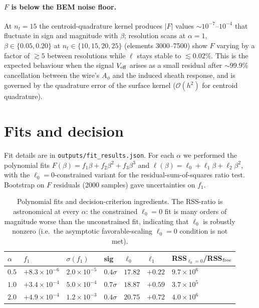 \documentclass[11pt]{article}
\begin{document}
\paragraph{$F$ is below the BEM noise floor.}  At $n_t=15$ the
centroid-quadrature kernel produces $|F|$ values $\sim10^{-7}$--$10^{-4}$
that fluctuate in sign and magnitude with $\beta$; resolution scans at
$\alpha=1$, $\beta\in\{0.05, 0.20\}$ at $n_t\in\{10,15,20,25\}$
(elements 3000--7500) show $F$ varying by a factor of $\gtrsim 5$
between resolutions while $\ell$ stays stable to $\lesssim 0.02\%$.
This is the expected behaviour when the signal $V_{\rm eff}$ arises as a
small residual after $\sim 99.9\%$ cancellation between the wire's
$A_\phi$ and the induced sheath response, and is governed by the
quadrature error of the surface kernel ($\mathcal O(h^2)$ for centroid
quadrature).

\section{Fits and decision}
\label{sec:fit}

Fit details are in \texttt{outputs/fit\_results.json}.  For each
$\alpha$ we performed the polynomial fits
$F(\beta)=f_1\beta+f_2\beta^2+f_3\beta^3$ and
$\ell(\beta)=\ell_0+\ell_1\beta+\ell_2\beta^2$, with the
$\ell_0\!=\!0$-constrained variant for the residual-sum-of-squares
ratio test.  Bootstrap on $F$ residuals (2000 samples) gave
uncertainties on $f_1$.

\begin{table}[h]
\centering
\begin{tabular}{lllllll}\toprule
$\alpha$ & $f_1$ & $\sigma(f_1)$ & sig & $\ell_0$ & $\ell_1$ & RSS$_{\ell_0=0}$/RSS$_{\rm free}$ \\\midrule
$0.5$ & $+8.3\!\times\!10^{-6}$ & $2.0\!\times\!10^{-5}$ & $0.4\sigma$ & $17.82$ & $+0.22$ & $9.7\!\times\!10^{6}$ \\
$1.0$ & $+3.4\!\times\!10^{-4}$ & $5.0\!\times\!10^{-4}$ & $0.7\sigma$ & $18.87$ & $+0.59$ & $3.7\!\times\!10^{5}$ \\
$2.0$ & $+4.9\!\times\!10^{-4}$ & $1.2\!\times\!10^{-3}$ & $0.4\sigma$ & $20.75$ & $+0.72$ & $4.0\!\times\!10^{6}$ \\\bottomrule
\end{tabular}
\caption{Polynomial fits and decision-criterion ingredients.  The
RSS-ratio is astronomical at every $\alpha$: the constrained
$\ell_0\!=\!0$ fit is many orders of magnitude worse than the
unconstrained fit, indicating that $\ell_0$ is robustly nonzero (i.e.\
the asymptotic favorable-scaling $\ell_0\!=\!0$ condition is not met).}
\label{tab:fits}
\end{table}
\end{document}
